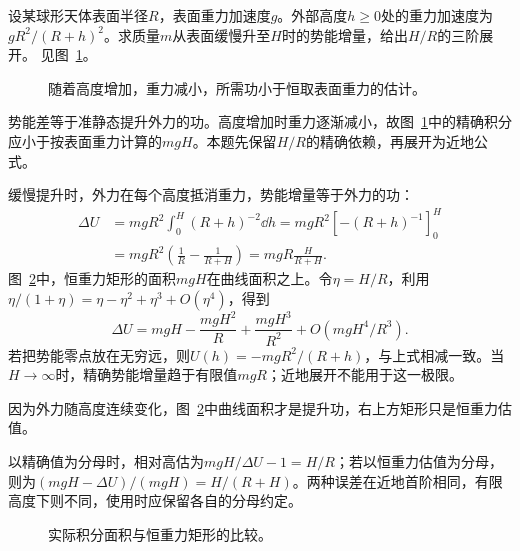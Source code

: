 \begin{exercise}[高度变化中的重力势能]\label{ex:c1-h13}
设某球形天体表面半径$R$，表面重力加速度$g$。外部高度$h\ge0$处的重力加速度为$gR^2/(R+h)^2$。求质量$m$从表面缓慢升至$H$时的势能增量，给出$H/R$的三阶展开。 见图~\ref{fig:c1-h13-q}。
\end{exercise}

\begin{figure}[H]\centering
{}
\caption{随着高度增加，重力减小，所需功小于恒取表面重力的估计。}\label{fig:c1-h13-q}
\end{figure}
\begin{solution}
势能差等于准静态提升外力的功。高度增加时重力逐渐减小，故图~\ref{fig:c1-h13-q}中的精确积分应小于按表面重力计算的$mgH$。本题先保留$H/R$的精确依赖，再展开为近地公式。


缓慢提升时，外力在每个高度抵消重力，势能增量等于外力的功：
\[\begin{aligned}
\Delta U&=mgR^2\int_0^H(R+h)^{-2}\dd h
=mgR^2[-(R+h)^{-1}]_0^H\\
&=mgR^2\left(\frac1R-\frac1{R+H}\right)
=\boxed{mgR\frac{H}{R+H}}.
\end{aligned}
\]
图~\ref{fig:c1-h13-s}中，恒重力矩形的面积$mgH$在曲线面积之上。令$\eta=H/R$，利用$\eta/(1+\eta)=\eta-\eta^2+\eta^3+O(\eta^4)$，得到
\[\Delta U=mgH-\frac{mgH^2}{R}+\frac{mgH^3}{R^2}+O(mgH^4/R^3).
\]
若把势能零点放在无穷远，则$U(h)=-mgR^2/(R+h)$，与上式相减一致。当$H\to\infty$时，精确势能增量趋于有限值$mgR$；近地展开不能用于这一极限。


因为外力随高度连续变化，图~\ref{fig:c1-h13-s}中曲线面积才是提升功，右上方矩形只是恒重力估值。

以精确值为分母时，相对高估为$mgH/\Delta U-1=H/R$；若以恒重力估值为分母，则为$(mgH-\Delta U)/(mgH)=H/(R+H)$。两种误差在近地首阶相同，有限高度下则不同，使用时应保留各自的分母约定。

\begin{figure}[H]\centering
{}
\caption{实际积分面积与恒重力矩形的比较。}\label{fig:c1-h13-s}
\end{figure}
\end{solution}

